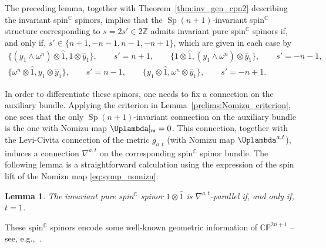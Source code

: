 \documentclass[pdftex]{sigma}
\numberwithin{equation}{section}
\newtheorem{Lemma}[Theorem]{Lemma}
\newcommand{\Z}{\mathbb{Z}} %
\newcommand{\C}{\mathbb{C}} %
\DeclareMathOperator{\Sp}{Sp}
\begin{document}
		The preceding lemma, together with Theorem~\ref{thm:inv_gen_cpn2} describing the invariant spin$^{\C}$ spinors, implies that the $\Sp(n+1)$-invariant spin$^{\mathbb{C}}$ structure corresponding to $s = 2s' \in 2\Z$ admits invariant pure spin$^{\mathbb{C}}$ spinors if, and only if, $s' \in \{n+1,-n-1,n-1,-n+1\}$, which are given in each case by
		\begin{gather*}
			\bigl\{ ( y_1 \wedge \omega^n ) \otimes \hat{1}, 1 \otimes \hat{y}_1 \bigr\},\qquad s' = n+1, \qquad
			\bigl\{ 1 \otimes \hat{1}, (y_1 \wedge \omega^n) \otimes \hat{y}_1 \bigr\},\qquad s' = -n-1, \\
			\bigl\{ \omega^n \otimes \hat{1}, y_1 \otimes \hat{y}_1 \bigr\},\qquad s' = n-1, \qquad
			\bigl\{ y_1 \otimes \hat{1}, \omega^n \otimes \hat{y}_1 \bigr\} ,\qquad s' = -n+1.
		\end{gather*}
		
		In order to differentiate these spinors, one needs to fix a connection on the auxiliary bundle. Applying the criterion in Lemma~\ref{prelims:Nomizu_criterion}, one sees that the only $\Sp(n+1)$-invariant connection on the auxiliary bundle is the one with Nomizu map $\Uplambda \rvert_{\mathfrak{m}} = 0$. This connection, together with the Levi-Civita connection of the metric $g_{a,t}$ (with Nomizu map $\Uplambda^{a,t}$), induces a connection $\nabla^{a,t}$ on the corresponding spin$^{\mathbb{C}}$ spinor bundle. The following lemma is a straightforward calculation using the expression of the spin lift of the Nomizu map \eqref{eq:symp_nomizu}:
		
		\begin{Lemma}\label{lemma:cp2n+1_parallel}
			The invariant pure spin$^{\mathbb{C}}$ spinor $1 \otimes \hat{1}$ is $\nabla^{a,t}$-parallel if, and only if, $t=1$.
		\end{Lemma}
		
		These spin$^{\C}$ spinors encode some well-known geometric information of $\mathbb{CP}^{2n+1}$ -- see, e.g.,~\cite{ziller}.
		
\end{document}
